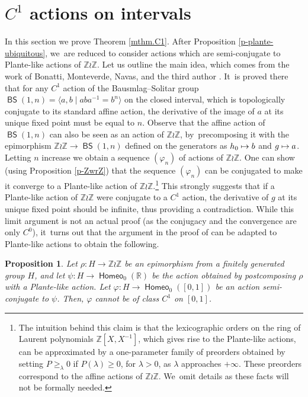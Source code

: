\documentclass[JEP,XML,SOM,Unicode,NoFloatCountersInSection,published]{cedram}
\def\mto{\mathchoice{\longmapsto}{\mapsto}{\mapsto}{\mapsto}}
\newtheorem{prop}[thm]{Proposition}
\theoremstyle{definition}
\DeclareMathOperator{\BS}{\mathsf{BS}}
\DeclareMathOperator{\homeo}{\mathsf{Homeo}}
\newcommand{\R}{\mathbb{R}}
\newcommand{\Z}{\mathbb Z}
\begin{document}
\section{\texorpdfstring{$C^1$}{C1} actions on intervals} \label{sc.C1}
In this section we prove Theorem \ref{mthm.C1}. After Proposition \ref{p-plante-ubiquitous}, we~are reduced to consider actions which are semi-conjugate to Plante-like actions of $\Z \wr \Z$. Let us outline the main idea, which comes from the work of Bonatti, Monteverde, Navas, and the third author \cite{BMNR}. It~is proved there that for any $C^1$ action of the Bausmlag--Solitar group $\BS(1, n)=\langle a, b\mid aba^{-1}=b^n\rangle$ on the closed interval, which is topologically conjugate to its standard affine action, the derivative of the image of $a$ at its unique fixed point must be equal to $n$. Observe that the affine action of $\BS(1, n)$ can also be seen as an action of $\Z \wr \Z$, by~precomposing it with the epimorphism $\Z\wr \Z\to \BS(1, n)$ defined on the generators as $h_0\mto b$ and $g\mto a$. Letting $n$ increase we obtain a sequence $(\varphi_n)$ of actions of $\Z \wr \Z$. One can show (using Proposition \ref{p-ZwrZ}) that the sequence $(\varphi_n)$ can be conjugated to make it converge to a Plante-like action of $\Z \wr \Z$.\footnote{The intuition behind this claim is that the lexicographic orders on the ring of Laurent polynomials $\Z[X, X^{-1}]$, which gives rise to the Plante-like actions, can be approximated by a one-parameter family of preorders obtained by setting $P\ge_\lambda 0$ if $P(\lambda)\ge 0$, for $\lambda>0$, as $\lambda$ approaches $+\infty$. These preorders correspond to the affine actions of $\Z \wr \Z$. We~omit details as these facts will not be formally needed.} This strongly suggests that if a Plante-like action of $\Z \wr \Z$ were conjugate to a $C^1$ action, the derivative of $g$ at its unique fixed point should be infinite, thus providing a contradiction. While this limit argument is not an actual proof (as the conjugacy and the convergence are only $C^0$), it~turns out that the argument in the proof of \cite[Prop.\,4.13]{BMNR} can be adapted to Plante-like actions to obtain the following.

\begin{prop}\label{p-plante-C1}
Let $\rho\colon H\to \Z\wr \Z$ be an epimorphism from a finitely generated group $H$, and let $\psi \colon H\to \homeo_0(\R)$ be the action obtained by postcomposing $\rho$ with a Plante-like action. Let $\varphi\colon H\to \homeo_0([0, 1])$ be an action semi-conjugate to $\psi$. Then, $\varphi$ cannot be of class $C^1$ on $[0,1]$.
\end{prop}
\end{document}
